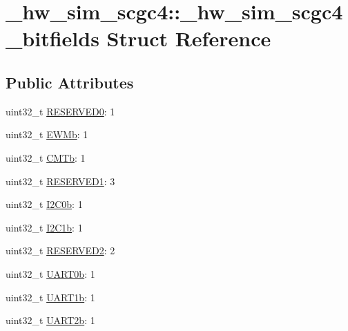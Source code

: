 \hypertarget{struct__hw__sim__scgc4_1_1__hw__sim__scgc4__bitfields}{}\section{\+\_\+hw\+\_\+sim\+\_\+scgc4\+:\+:\+\_\+hw\+\_\+sim\+\_\+scgc4\+\_\+bitfields Struct Reference}
\label{struct__hw__sim__scgc4_1_1__hw__sim__scgc4__bitfields}
\subsection*{Public Attributes}
\begin{DoxyCompactItemize}
\item 
uint32\+\_\+t \hyperlink{struct__hw__sim__scgc4_1_1__hw__sim__scgc4__bitfields_ac7300abe7f48e4350741286c3ea37fe7}{R\+E\+S\+E\+R\+V\+E\+D0}\+: 1
\item 
uint32\+\_\+t \hyperlink{struct__hw__sim__scgc4_1_1__hw__sim__scgc4__bitfields_a861137a114782e1873072a4c175c246d}{E\+W\+Mb}\+: 1
\item 
uint32\+\_\+t \hyperlink{struct__hw__sim__scgc4_1_1__hw__sim__scgc4__bitfields_aef8b1ac19ae9cf3a26b4a132b8cc9d44}{C\+M\+Tb}\+: 1
\item 
uint32\+\_\+t \hyperlink{struct__hw__sim__scgc4_1_1__hw__sim__scgc4__bitfields_ae4bff9c251f297d6672f5672fca77042}{R\+E\+S\+E\+R\+V\+E\+D1}\+: 3
\item 
uint32\+\_\+t \hyperlink{struct__hw__sim__scgc4_1_1__hw__sim__scgc4__bitfields_a3bcfe7bc09ee447283dc8846ab931bf0}{I2\+C0b}\+: 1
\item 
uint32\+\_\+t \hyperlink{struct__hw__sim__scgc4_1_1__hw__sim__scgc4__bitfields_a2d47a80660032115a64878bdd4ebeb12}{I2\+C1b}\+: 1
\item 
uint32\+\_\+t \hyperlink{struct__hw__sim__scgc4_1_1__hw__sim__scgc4__bitfields_a2241a92f92bbb9c0028ef613f179b706}{R\+E\+S\+E\+R\+V\+E\+D2}\+: 2
\item 
uint32\+\_\+t \hyperlink{struct__hw__sim__scgc4_1_1__hw__sim__scgc4__bitfields_a5401d1bb7153519677f6e3c31ddbf9a8}{U\+A\+R\+T0b}\+: 1
\item 
uint32\+\_\+t \hyperlink{struct__hw__sim__scgc4_1_1__hw__sim__scgc4__bitfields_a0245d19f9362a7a63794b5010274f399}{U\+A\+R\+T1b}\+: 1
\item 
uint32\+\_\+t \hyperlink{struct__hw__sim__scgc4_1_1__hw__sim__scgc4__bitfields_a401fac2aaad9433ff6865fa2072c1121}{U\+A\+R\+T2b}\+: 1

\end{DoxyCompactItemize}
